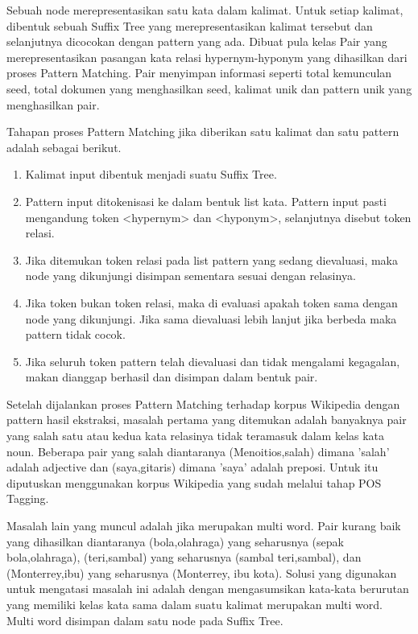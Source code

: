 Sebuah node merepresentasikan satu kata dalam kalimat. Untuk setiap kalimat, dibentuk sebuah Suffix Tree yang merepresentasikan kalimat tersebut dan selanjutnya dicocokan dengan pattern yang ada. Dibuat pula kelas Pair yang merepresentasikan pasangan kata relasi hypernym-hyponym yang dihasilkan dari proses Pattern Matching. Pair menyimpan informasi seperti total kemunculan seed, total dokumen yang menghasilkan seed, kalimat unik dan pattern unik yang menghasilkan pair.

Tahapan proses Pattern Matching jika diberikan satu kalimat dan satu pattern adalah sebagai berikut.
\begin{enumerate}
  \item Kalimat input dibentuk menjadi suatu Suffix Tree.
  \item Pattern input ditokenisasi ke dalam bentuk list kata. Pattern input pasti mengandung token <hypernym> dan <hyponym>, selanjutnya disebut token relasi.
  \item Jika ditemukan token relasi pada list pattern yang sedang dievaluasi, maka node yang dikunjungi disimpan sementara sesuai dengan relasinya.
  \item Jika token bukan token relasi, maka di evaluasi apakah token sama dengan node yang dikunjungi. Jika sama dievaluasi lebih lanjut jika berbeda maka pattern tidak cocok.
  \item Jika seluruh token pattern telah dievaluasi dan tidak mengalami kegagalan, makan dianggap berhasil dan disimpan dalam bentuk pair.
\end{enumerate}
Setelah dijalankan proses Pattern Matching terhadap korpus Wikipedia dengan pattern hasil ekstraksi, masalah pertama yang ditemukan adalah banyaknya pair yang salah satu atau kedua kata relasinya tidak teramasuk dalam kelas kata noun. Beberapa pair yang salah diantaranya (Menoitios,salah) dimana 'salah' adalah adjective dan (saya,gitaris) dimana 'saya' adalah preposi. Untuk itu diputuskan menggunakan korpus Wikipedia yang sudah melalui tahap POS Tagging.

Masalah lain yang muncul adalah jika merupakan multi word. Pair kurang baik yang dihasilkan diantaranya (bola,olahraga) yang seharusnya (sepak bola,olahraga), (teri,sambal) yang seharusnya (sambal teri,sambal), dan (Monterrey,ibu) yang seharusnya (Monterrey, ibu kota). Solusi yang digunakan untuk mengatasi masalah ini adalah dengan mengasumsikan kata-kata berurutan yang memiliki kelas kata sama dalam suatu kalimat merupakan multi word. Multi word disimpan dalam satu node pada Suffix Tree.

